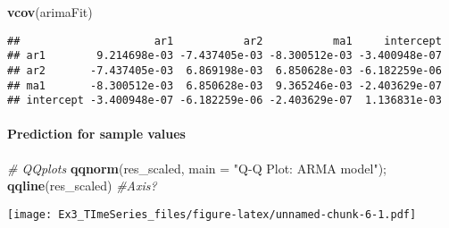 \documentclass[]{article}
\newenvironment{Shaded}{\begin{snugshade}}{\end{snugshade}}
\newcommand{\KeywordTok}[1]{\textcolor[rgb]{0.13,0.29,0.53}{\textbf{#1}}}
\newcommand{\DataTypeTok}[1]{\textcolor[rgb]{0.13,0.29,0.53}{#1}}
\newcommand{\StringTok}[1]{\textcolor[rgb]{0.31,0.60,0.02}{#1}}
\newcommand{\CommentTok}[1]{\textcolor[rgb]{0.56,0.35,0.01}{\textit{#1}}}
\newcommand{\NormalTok}[1]{#1}
\let\oldparagraph\paragraph
\renewcommand{\paragraph}[1]{\oldparagraph{#1}\mbox{}}
\begin{document}
\begin{Shaded}
\begin{Highlighting}[]
\KeywordTok{vcov}\NormalTok{(arimaFit)}
\end{Highlighting}
\end{Shaded}

\begin{verbatim}
##                     ar1           ar2           ma1     intercept
## ar1        9.214698e-03 -7.437405e-03 -8.300512e-03 -3.400948e-07
## ar2       -7.437405e-03  6.869198e-03  6.850628e-03 -6.182259e-06
## ma1       -8.300512e-03  6.850628e-03  9.365246e-03 -2.403629e-07
## intercept -3.400948e-07 -6.182259e-06 -2.403629e-07  1.136831e-03
\end{verbatim}

\paragraph{Prediction for sample
values}\label{prediction-for-sample-values}

\begin{Shaded}
\begin{Highlighting}[]
\CommentTok{# QQplots}
\KeywordTok{qqnorm}\NormalTok{(res_scaled, }\DataTypeTok{main =} \StringTok{"Q-Q Plot: ARMA model"}\NormalTok{); }\KeywordTok{qqline}\NormalTok{(res_scaled) }\CommentTok{#Axis?}
\end{Highlighting}
\end{Shaded}

\texttt{[image: Ex3\_TImeSeries\_files/figure-latex/unnamed-chunk-6-1.pdf]}
\end{document}
